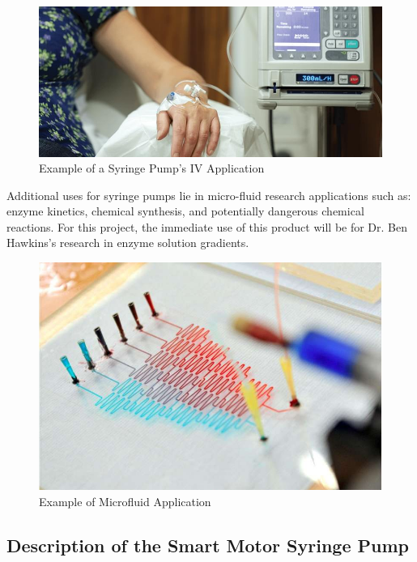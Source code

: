 \documentclass[journal]{IEEEtran}
\begin{document}
        \begin{figure}[H]
            \centering
            \includegraphics[scale=0.27]{IV_example}
            \caption{Example of a Syringe Pump's IV Application \cite{howto-syringe}}
            \label{fig:IV_example}
        \end{figure}
        
        Additional uses for syringe pumps lie in micro-fluid research applications such as: enzyme kinetics, chemical synthesis, and potentially dangerous chemical reactions. For this project, the immediate use of this product will be for Dr. Ben Hawkins's research in enzyme solution gradients.
        
        \begin{figure}[H]
            \centering
            \includegraphics[scale=0.29]{Images/microfluid_example.jpg}
            \caption{Example of Microfluid Application \cite{mf_ex}}
            \label{fig:mf_example}
        \end{figure}
        
    \subsection{Description of the Smart Motor Syringe Pump}
    
\end{document}
